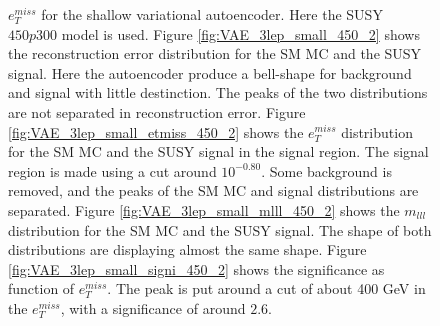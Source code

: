 \begin{figure}[H]
{    $e_T^{miss}$ for the shallow variational autoencoder. Here the SUSY $450p300$ model is used.
    Figure \ref{fig:VAE_3lep_small_450_2} shows the reconstruction error 
    distribution for the SM MC and the SUSY signal. Here the autoencoder produce a bell-shape for background and 
    signal with little destinction. The peaks of the two distributions are not separated in reconstruction error. Figure \ref{fig:VAE_3lep_small_etmiss_450_2} 
    shows the $e_T^{miss}$ distribution for the SM MC and the SUSY signal in the signal region. 
    The signal region is made using a cut around $10^{-0.80}$. Some background is removed, and the peaks of the SM MC and signal 
    distributions are separated. Figure \ref{fig:VAE_3lep_small_mlll_450_2} shows the $m_{lll}$ distribution for the SM MC and the SUSY signal. 
    The shape of both distributions are displaying almost the same shape. Figure \ref{fig:VAE_3lep_small_signi_450_2} shows the significance as 
    function of $e_T^{miss}$. The peak is put around a cut of about 400 GeV in the $e_T^{miss}$, with a significance of around $2.6$.}
    \label{fig:VAE_3lep_small_rec_sig_signi_450_2}
\end{figure}








